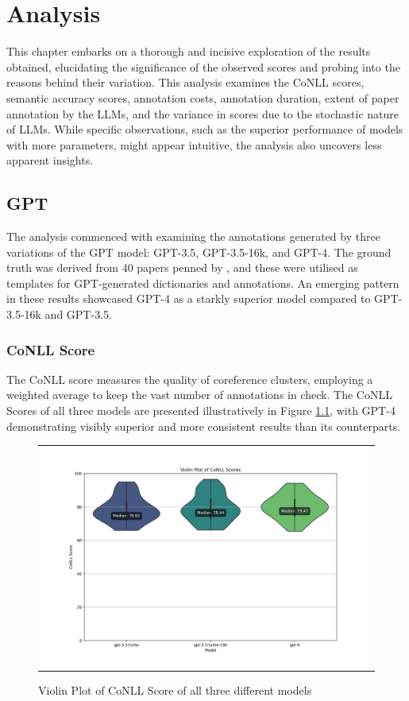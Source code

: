\chapter{Analysis}\label{chapter:analysis}

This chapter embarks on a thorough and incisive exploration of the results obtained, elucidating the significance of the observed scores and probing into the reasons behind their variation. This analysis examines the CoNLL scores, semantic accuracy scores, annotation costs, annotation duration, extent of paper annotation by the LLMs, and the variance in scores due to the stochastic nature of LLMs. While specific observations, such as the superior performance of models with more parameters, might appear intuitive, the analysis also uncovers less apparent insights.

\section{GPT}
The analysis commenced with examining the annotations generated by three variations of the GPT model: GPT-3.5, GPT-3.5-16k, and GPT-4. The ground truth was derived from 40 papers penned by \citet{asakura2022building}, and these were utilised as templates for GPT-generated dictionaries and annotations. An emerging pattern in these results showcased GPT-4 as a starkly superior model compared to GPT-3.5-16k and GPT-3.5. 

\subsection{CoNLL Score}
The CoNLL score measures the quality of coreference clusters, employing a weighted average to keep the vast number of annotations in check. The CoNLL Scores of all three models are presented illustratively in Figure \ref{fig:violin-conll}, with GPT-4 demonstrating visibly superior and more consistent results than its counterparts.

\begin{figure}[htpb]
  \centering
  \begin{tabular}{c}
  \includegraphics[width=14cm]{images/conll-score.png}
  \end{tabular}
  \caption[Distribution of CoNLL Score]{Violin Plot of CoNLL Score of all three different models}\label{fig:violin-conll}
\end{figure}

